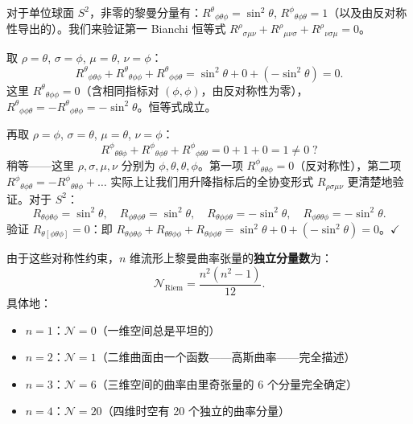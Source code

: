 \begin{example}
对于单位球面 $S^2$，非零的黎曼分量有：$R^\theta{}_{\phi\theta\phi} = \sin^2\theta$, $R^\phi{}_{\theta\phi\theta} = 1$（以及由反对称性导出的）。我们来验证第一 Bianchi 恒等式 $R^\rho{}_{\sigma\mu\nu} + R^\rho{}_{\mu\nu\sigma} + R^\rho{}_{\nu\sigma\mu} = 0$。

取 $\rho = \theta$, $\sigma = \phi$, $\mu = \theta$, $\nu = \phi$：
\[
R^\theta{}_{\phi\theta\phi} + R^\theta{}_{\theta\phi\phi} + R^\theta{}_{\phi\phi\theta}
= \sin^2\theta + 0 + (-\sin^2\theta) = 0.
\]
这里 $R^\theta{}_{\theta\phi\phi} = 0$（含相同指标对 $(\phi,\phi)$，由反对称性为零），$R^\theta{}_{\phi\phi\theta} = -R^\theta{}_{\phi\theta\phi} = -\sin^2\theta$。恒等式成立。

再取 $\rho = \phi$, $\sigma = \theta$, $\mu = \theta$, $\nu = \phi$：
\[
R^\phi{}_{\theta\theta\phi} + R^\phi{}_{\theta\phi\theta} + R^\phi{}_{\phi\theta\theta}
= 0 + 1 + 0 = 1 \neq 0\;?
\]
稍等——这里 $\rho,\sigma,\mu,\nu$ 分别为 $\phi,\theta,\theta,\phi$。第一项 $R^\phi{}_{\theta\theta\phi} = 0$（反对称性），第二项 $R^\phi{}_{\theta\phi\theta} = -R^\phi{}_{\theta\theta\phi} + \dots$ 实际上让我们用升降指标后的全协变形式 $R_{\rho\sigma\mu\nu}$ 更清楚地验证。对于 $S^2$：
\[
R_{\theta\phi\theta\phi} = \sin^2\theta,\quad R_{\phi\theta\phi\theta} = \sin^2\theta,\quad R_{\theta\phi\phi\theta} = -\sin^2\theta,\quad R_{\phi\theta\theta\phi} = -\sin^2\theta.
\]
验证 $R_{\theta[\phi\theta\phi]} = 0$：即 $R_{\theta\phi\theta\phi} + R_{\theta\theta\phi\phi} + R_{\theta\phi\phi\theta} = \sin^2\theta + 0 + (-\sin^2\theta) = 0$。\hfill $\checkmark$
\end{example}

\begin{property}[独立分量计数]
由于这些对称性约束，$n$ 维流形上黎曼曲率张量的\textbf{独立分量数}为：
\begin{equation}
    \mathcal{N}_{\text{Riem}} = \frac{n^2(n^2 - 1)}{12}.
\end{equation}
具体地：
\begin{itemize}
    \item $n=1$：$\mathcal{N} = 0$（一维空间总是平坦的）
    \item $n=2$：$\mathcal{N} = 1$（二维曲面由一个函数——高斯曲率——完全描述）
    \item $n=3$：$\mathcal{N} = 6$（三维空间的曲率由里奇张量的 6 个分量完全确定）
    \item $n=4$：$\mathcal{N} = 20$（四维时空有 20 个独立的曲率分量）
\end{itemize}
\end{property}

